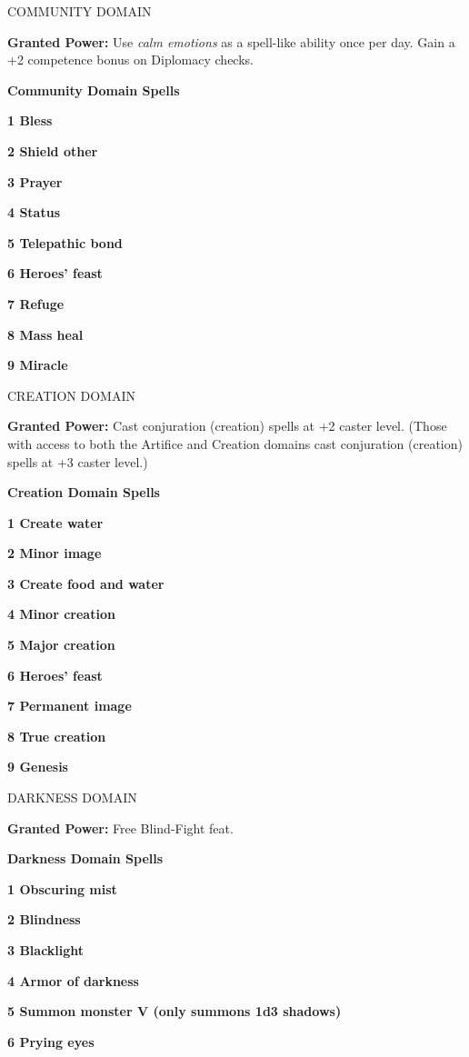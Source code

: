 \documentclass{article}
\begin{document}
\vspace{12pt}
COMMUNITY DOMAIN

\textbf{Granted Power:} Use \textit{calm emotions }as a spell-like ability once 
per day. Gain a +2 competence bonus on Diplomacy checks.

\textbf{Community Domain Spells}

\textbf{1 Bless}

\textbf{2 Shield other}

\textbf{3 Prayer}

\textbf{4 Status}

\textbf{5 Telepathic bond}

\textbf{6 Heroes' feast}

\textbf{7 Refuge}

\textbf{8 Mass heal}

\textbf{9 Miracle}

\vspace{12pt}
CREATION DOMAIN

\textbf{Granted Power:} Cast conjuration (creation) spells at +2 caster level. 
(Those with access to both the Artifice and Creation domains cast conjuration (creation) 
spells at +3 caster level.)

\textbf{Creation Domain Spells}

\textbf{1 Create water}

\textbf{2 Minor image}

\textbf{3 Create food and water}

\textbf{4 Minor creation}

\textbf{5 Major creation}

\textbf{6 Heroes' feast}

\textbf{7 Permanent image}

\textbf{8 True creation}

\textbf{9 Genesis}

\vspace{12pt}
DARKNESS DOMAIN

\textbf{Granted Power:} Free Blind-Fight feat.

\textbf{Darkness Domain Spells}

\textbf{1 Obscuring mist}

\textbf{2 Blindness}

\textbf{3 Blacklight}

\textbf{4 Armor of darkness}

\textbf{5 Summon monster V (only summons 1d3 shadows)}

\textbf{6 Prying eyes}
\end{document}
